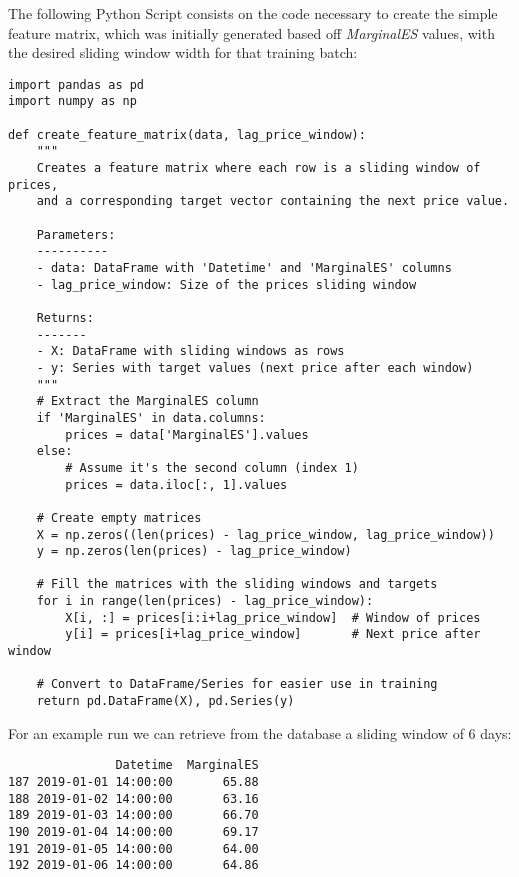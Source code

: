 \documentclass[12pt]{report} %
\begin{document}
The following Python Script consists on the code necessary to create the simple feature matrix, which was initially generated based off \textit{MarginalES} values, with the desired sliding window width for that training batch:
\begin{lstlisting}
import pandas as pd
import numpy as np

def create_feature_matrix(data, lag_price_window):
    """
    Creates a feature matrix where each row is a sliding window of prices,
    and a corresponding target vector containing the next price value.
    
    Parameters:
    ----------
    - data: DataFrame with 'Datetime' and 'MarginalES' columns
    - lag_price_window: Size of the prices sliding window
    
    Returns:
    -------
    - X: DataFrame with sliding windows as rows
    - y: Series with target values (next price after each window)
    """
    # Extract the MarginalES column
    if 'MarginalES' in data.columns:
        prices = data['MarginalES'].values
    else:
        # Assume it's the second column (index 1)
        prices = data.iloc[:, 1].values
    
    # Create empty matrices
    X = np.zeros((len(prices) - lag_price_window, lag_price_window))
    y = np.zeros(len(prices) - lag_price_window)
    
    # Fill the matrices with the sliding windows and targets
    for i in range(len(prices) - lag_price_window):
        X[i, :] = prices[i:i+lag_price_window]  # Window of prices
        y[i] = prices[i+lag_price_window]       # Next price after window
    
    # Convert to DataFrame/Series for easier use in training
    return pd.DataFrame(X), pd.Series(y)
\end{lstlisting}

For an example run we can retrieve from the database a sliding window of 6 days:
\begin{small}
\begin{verbatim}
               Datetime  MarginalES
187 2019-01-01 14:00:00       65.88
188 2019-01-02 14:00:00       63.16
189 2019-01-03 14:00:00       66.70
190 2019-01-04 14:00:00       69.17
191 2019-01-05 14:00:00       64.00
192 2019-01-06 14:00:00       64.86
\end{verbatim}
\end{small}
\end{document}
